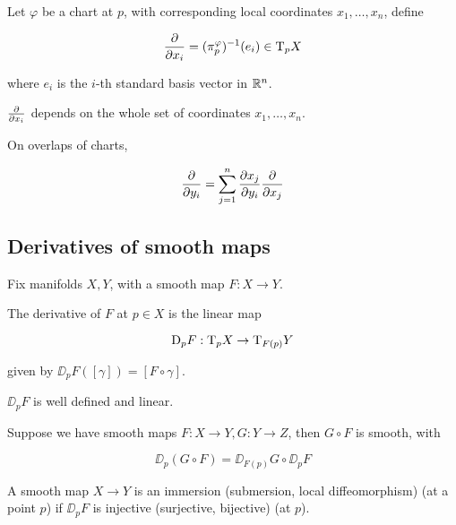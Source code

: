 \begin{definition}

    Let \(\varphi\) be a chart at \(p\), with corresponding local coordinates \(x_1, \dots, x_n\), define

    \[\pdv{x_i} = (\pi_p^\varphi)^{-1}(e_i) \in \mathrm{T}_pX\]

    where \(e_i\) is the \(i\)-th standard basis vector in \(\mathbb{R}^n\).
\end{definition}

\begin{remark}
    \(\pdv{x_i}\) depends on the whole set of coordinates \(x_1, \dots, x_n\).
\end{remark}

\begin{lemma}
    On overlaps of charts,

    \[\pdv{y_i} = \sum_{j=1}^n \pdv{x_j}{y_i}\pdv{x_j}\]
\end{lemma}

\subsection{Derivatives of smooth maps}

Fix manifolds \(X, Y\), with a smooth map \(F : X \to Y\).

\begin{definition}
    [derivative] The derivative of \(F\) at \(p \in X\) is the linear map

    \[\mathrm{D}_pF : \mathrm{T}_pX \to \mathrm{T}_{F(p)}Y\]

    given by \(\DD_pF([\gamma]) = [F \circ \gamma]\).
\end{definition}

\begin{lemma}
    \(\DD_pF\) is well defined and linear.
\end{lemma}

\begin{lemma}

    Suppose we have smooth maps \(F : X \to Y, G : Y \to Z\), then \(G \circ F\) is smooth, with

    \[\DD_p(G \circ F) = \DD_{F(p)}G \circ \DD_pF\]
\end{lemma}

\begin{definition}

    A smooth map \(X \to Y\) is an immersion (submersion, local diffeomorphism) (at a point \(p\)) if \(\DD_pF\) is injective (surjective, bijective) (at \(p\)).
\end{definition}

